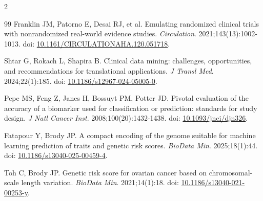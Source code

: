 \documentclass[10pt,letterpaper]{article}
\begin{document}
\begin{multicols}{2}
\begin{thebibliography}{99}
 Franklin JM, Patorno E, Desai RJ, et al. Emulating randomized clinical trials with nonrandomized real-world evidence studies. \textit{Circulation}. 2021;143(13):1002-1013. doi: \href{https://doi.org/10.1161/CIRCULATIONAHA.120.051718}{10.1161/CIRCULATIONAHA.120.051718}.

 Shtar G, Rokach L, Shapira B. Clinical data mining: challenges, opportunities, and recommendations for translational applications. \textit{J Transl Med}. 2024;22(1):185. doi: \href{https://doi.org/10.1186/s12967-024-05005-0}{10.1186/s12967-024-05005-0}.

 Pepe MS, Feng Z, Janes H, Bossuyt PM, Potter JD. Pivotal evaluation of the accuracy of a biomarker used for classification or prediction: standards for study design. \textit{J Natl Cancer Inst}. 2008;100(20):1432-1438. doi: \href{https://doi.org/10.1093/jnci/djn326}{10.1093/jnci/djn326}.

 Fatapour Y, Brody JP. A compact encoding of the genome suitable for machine learning prediction of traits and genetic risk scores. \textit{BioData Min}. 2025;18(1):44. doi: \href{https://doi.org/10.1186/s13040-025-00459-4}{10.1186/s13040-025-00459-4}.

 Toh C, Brody JP. Genetic risk score for ovarian cancer based on chromosomal-scale length variation. \textit{BioData Min}. 2021;14(1):18. doi: \href{https://doi.org/10.1186/s13040-021-00253-y}{10.1186/s13040-021-00253-y}.

\end{thebibliography}
\endgroup
\end{multicols}
\end{document}
